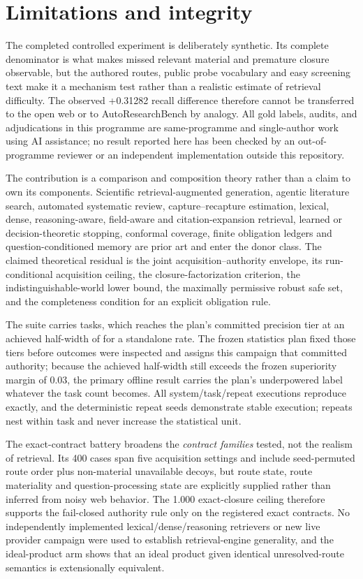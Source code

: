 \documentclass[11pt]{article}
\theoremstyle{definition}
\begin{document}
\section{Limitations and integrity}
The completed controlled experiment is deliberately synthetic. Its complete denominator is what makes missed relevant material and premature closure observable, but the authored routes, public probe vocabulary and easy screening text make it a mechanism test rather than a realistic estimate of retrieval difficulty. The observed +0.31282 recall difference therefore cannot be transferred to the open web or to AutoResearchBench by analogy. All gold labels, audits, and adjudications in this programme are same-programme and single-author work using AI assistance; no result reported here has been checked by an out-of-programme reviewer or an independent implementation outside this repository.

The contribution is a comparison and composition theory rather than a claim to
own its components.  Scientific retrieval-augmented generation, agentic
literature search, automated systematic review, capture--recapture estimation,
lexical, dense, reasoning-aware, field-aware and citation-expansion retrieval,
learned or decision-theoretic stopping, conformal coverage, finite obligation
ledgers and question-conditioned memory are prior art and enter the donor class.
The claimed theoretical residual is the joint acquisition--authority envelope,
its run-conditional acquisition ceiling, the closure-factorization criterion,
the indistinguishable-world lower bound, the maximally permissive robust safe
set, and the completeness condition for an explicit obligation rule.

The suite carries \OfflineTaskCount{} tasks, which reaches the plan's committed precision tier at an achieved half-width of \OfflineAchievedHalfWidth{} for a standalone rate. The frozen statistics plan fixed those tiers before outcomes were inspected and assigns this campaign that committed authority; because the achieved half-width still exceeds the frozen superiority margin of $0.03$, the primary offline result carries the plan's underpowered label whatever the task count becomes. All \OfflineRunRecordCount{} system/task/repeat executions reproduce exactly, and the \OfflineRepeatCount{} deterministic repeat seeds demonstrate stable execution; repeats nest within task and never increase the statistical unit.

The exact-contract battery broadens the \emph{contract families} tested, not the realism of retrieval. Its 400 cases span five acquisition settings and include seed-permuted route order plus non-material unavailable decoys, but route state, route materiality and question-processing state are explicitly supplied rather than inferred from noisy web behavior. The 1.000 exact-closure ceiling therefore supports the fail-closed authority rule only on the registered exact contracts. No independently implemented lexical/dense/reasoning retrievers or new live provider campaign were used to establish retrieval-engine generality, and the ideal-product arm shows that an ideal product given identical unresolved-route semantics is extensionally equivalent.
\end{document}
